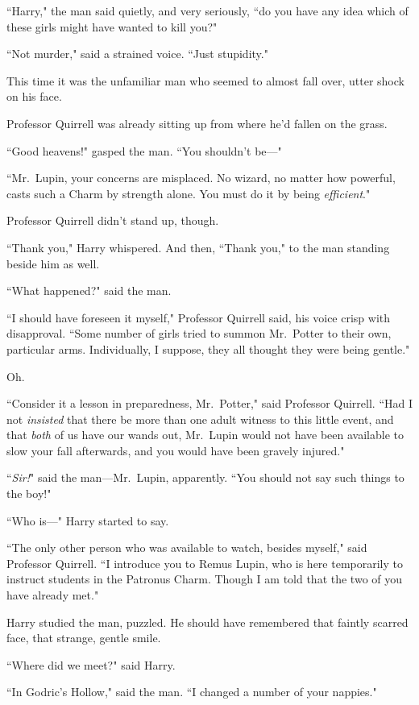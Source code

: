 ``Harry," the man said quietly, and very seriously, ``do you have any idea which of these girls might have wanted to kill you?"

``Not murder," said a strained voice. ``Just stupidity."

This time it was the unfamiliar man who seemed to almost fall over, utter shock on his face.

Professor Quirrell was already sitting up from where he'd fallen on the grass.

``Good heavens!" gasped the man. ``You shouldn't be—"

``Mr.~Lupin, your concerns are misplaced. No wizard, no matter how powerful, casts such a Charm by strength alone. You must do it by being \emph{efficient}."

Professor Quirrell didn't stand up, though.

``Thank you," Harry whispered. And then, ``Thank you," to the man standing beside him as well.

``What happened?" said the man.

``I should have foreseen it myself," Professor Quirrell said, his voice crisp with disapproval. ``Some number of girls tried to summon Mr.~Potter to their own, particular arms. Individually, I suppose, they all thought they were being gentle."

Oh.

``Consider it a lesson in preparedness, Mr.~Potter," said Professor Quirrell. ``Had I not \emph{insisted} that there be more than one adult witness to this little event, and that \emph{both} of us have our wands out, Mr.~Lupin would not have been available to slow your fall afterwards, and you would have been gravely injured."

``\emph{Sir!}" said the man—Mr.~Lupin, apparently. ``You should not say such things to the boy!"

``Who is—" Harry started to say.

``The only other person who was available to watch, besides myself," said Professor Quirrell. ``I introduce you to Remus Lupin, who is here temporarily to instruct students in the Patronus Charm. Though I am told that the two of you have already met."

Harry studied the man, puzzled. He should have remembered that faintly scarred face, that strange, gentle smile.

``Where did we meet?" said Harry.

``In Godric's Hollow," said the man. ``I changed a number of your nappies."

